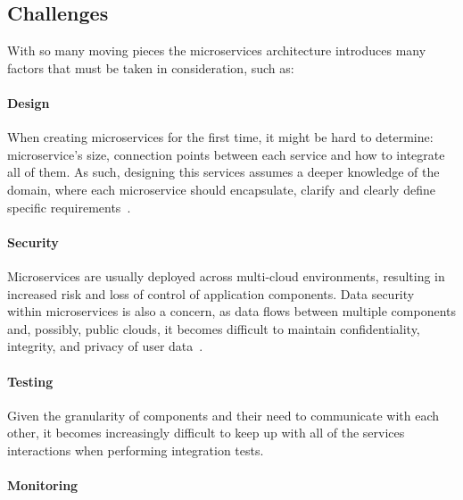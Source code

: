\subsection{Challenges}
\label{ss:microservices-challenges}

With so many moving pieces the microservices architecture introduces many factors that must be taken in consideration, such as:

\paragraph{\textbf{Design}} When creating microservices for the first time, it might be hard to determine: microservice's size, connection points between each service and how to integrate all of them. As such, designing this services assumes a deeper knowledge of the domain, where each microservice should encapsulate, clarify and clearly define specific requirements~\cite{microservices-challenges-1}.

\paragraph{\textbf{Security}} Microservices are usually deployed across multi-cloud environments, resulting in increased risk and loss of control of application components. Data security~\cite{data-security} within microservices is also a concern, as data flows between multiple components and, possibly, public clouds, it becomes difficult to maintain confidentiality, integrity, and privacy of user data~\cite{microservices-challenges-2}.

\paragraph{\textbf{Testing}} Given the granularity of components and their need to communicate with each other, it becomes increasingly difficult to keep up with all of the services interactions when performing integration tests.

\paragraph{\textbf{Monitoring}} %

